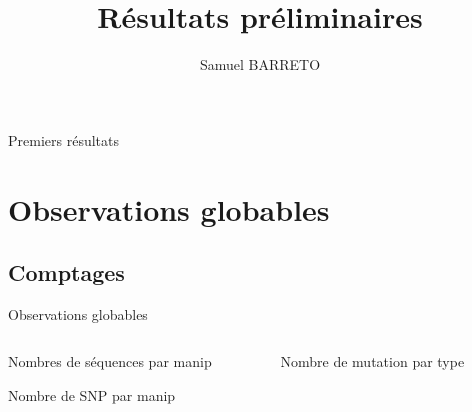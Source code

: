 \documentclass[xcolor=dvipsnames]{beamer}
\title{Résultats préliminaires}
\author{Samuel BARRETO}
\begin{document}
\frame[plain]{\titlepage}

\begin{frame}[plain]{Premiers résultats}
	\tableofcontents
\end{frame}

\section{Observations globables}
\label{sec:observ-glob}

\subsection{Comptages}

\begin{frame}{Observations globables}
  \begin{columns}
    \begin{column}{.5\textwidth}
      \scriptsize
      \begin{table}[htbp]
        \centering
        
        \caption*{Nombres de séquences par manip}
      \end{table}

      \begin{table}[htbp]
        \centering
        
        \caption*{Nombre de SNP par manip}
      \end{table}
      
    \end{column}
    
    \begin{column}{.5\textwidth}
      \begin{table}[htbp]
        \centering
        
        \caption*{Nombre de mutation par type}
      \end{table}
      
    \end{column}
  \end{columns}

  
\end{frame}
\end{document}
